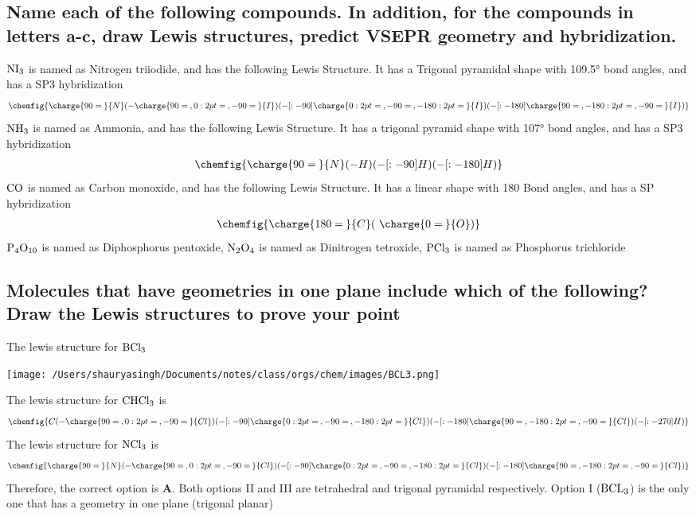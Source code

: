 \documentclass[11pt]{article}
\begin{document}
\subsection{Name each of the following compounds. In addition, for the compounds in letters a-c, draw Lewis structures, predict VSEPR geometry and hybridization.}
\label{sec:org98b819c}
\(\ce{NI3}\) is named as Nitrogen triiodide, and has the following Lewis Structure. It has a Trigonal pyramidal shape with 109.5° bond angles, and has a SP3 hybridization
\begin{align}
\chemfig{\charge{90=\:}{N}(-\charge{90=\:, 0:2pt=\:, -90=\:}{I})(-[:-90]\charge{0:2pt=\:, -90=\:, -180:2pt=\:}{I})(-[:-180]\charge{90=\:, -180:2pt=\:, -90=\:}{I})}
\end{align}
\(\ce{NH3}\) is named as Ammonia, and has the following Lewis Structure. It has a trigonal pyramid shape with 107° bond angles, and has a SP3 hybridization
\begin{align}
\chemfig{\charge{90=\:}{N}(-{H})(-[:-90]{H})(-[:-180]{H})}
\end{align}
\(\ce{CO}\) is named as Carbon monoxide, and has the following Lewis Structure. It has a linear shape with 180\textdegree{} Bond angles, and has a SP hybridization
\begin{align}
\chemfig{\charge{180=\:}{C}(~\charge{0=\:}{O})}
\end{align}
\(\ce{P4O10}\) is named as Diphosphorus pentoxide,
\(\ce{N2O4}\) is named as Dinitrogen tetroxide,
\(\ce{PCl3}\) is named as Phosphorus trichloride

\subsection{Molecules that have geometries in one plane include which of the following? Draw the Lewis structures to prove your point}
\label{sec:org80ff8bd}
The lewis structure for \(\ce{BCl3}\)
\begin{center}
\texttt{[image: /Users/shauryasingh/Documents/notes/class/orgs/chem/images/BCL3.png]}
\end{center}
The lewis structure for \(\ce{CHCl3}\) is
\begin{align}
\chemfig{{C}(-\charge{90=\:, 0:2pt=\:, -90=\:}{Cl})(-[:-90]\charge{0:2pt=\:, -90=\:, -180:2pt=\:}{Cl})(-[:-180]\charge{90=\:, -180:2pt=\:, -90=\:}{Cl})(-[:-270]{H})}
\end{align}
The lewis structure for \(\ce{NCl3}\) is
\begin{align}
\chemfig{\charge{90=\:}{N}(-\charge{90=\:, 0:2pt=\:, -90=\:}{Cl})(-[:-90]\charge{0:2pt=\:, -90=\:, -180:2pt=\:}{Cl})(-[:-180]\charge{90=\:, -180:2pt=\:, -90=\:}{Cl})}
\end{align}
Therefore, the correct option is \textbf{A}. Both options II and III are tetrahedral and trigonal pyramidal respectively. Option I (\(\ce{BCL3}\)) is the only one that has a geometry in one plane (trigonal planar)
\end{document}
